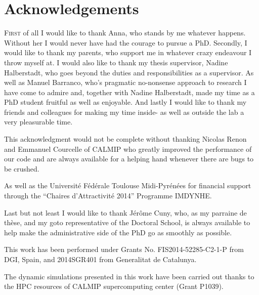 \chapter{Acknowledgements}
	
	\lettrine[lines=4]{\color{activeColor}F}{irst} of all I would like to thank Anna, who stands by me whatever happens. Without her I would never have had the courage to pursue a PhD.
	Secondly, I would like to thank my parents, who support me in whatever crazy endeavour I throw myself at. 
	I would also like to thank my thesis supervisor, Nadine Halberstadt, who goes beyond the duties and responsibilities as a supervisor. As well as Manuel Barranco, who's pragmatic no-nonsense approach to research I have come to admire and, together with Nadine Halberstadt, made my time as a PhD student fruitful as well as enjoyable.
	And lastly I would like to thank my friends and colleagues for making my time inside- as well as outside the lab a very pleasurable time. 
	
	This acknowledgment would not be complete without thanking Nicolas Renon and Emmanuel Courcelle of CALMIP who greatly improved the performance of our code and are always available for a helping hand whenever there are bugs to be crushed.
	
	As well as the Universit\'e F\'ed\'erale Toulouse Midi-Pyr\'en\'ees for financial support through the ``Chaires d'Attractivit\'e 2014'' Programme IMDYNHE.
	
	Last but not least I would like to thank Jérôme Cuny, who, as my parraine de thèse, and my goto representative of the Doctoral School, is always available to help make the administrative side of the PhD go as smoothly as possible.  
	
	This work has been performed under Grants No. FIS2014-52285-C2-1-P from DGI, Spain, and  2014SGR401 from Generalitat de Catalunya.

	The dynamic simulations presented in this work have been carried out thanks to the HPC resources of CALMIP supercomputing center (Grant P1039).

\clearpage{\pagestyle{empty}\cleardoublepage}